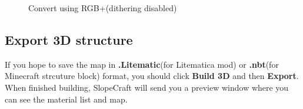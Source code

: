 \documentclass{article}
\begin{document}
    \begin{figure}[htbp]
        \centering
        \setcounter{subfigure}{0}
        \caption{Convert using RGB+(dithering disabled)}
    \end{figure}
    
    \subsection{Export 3D structure}
    If you hope to save the map in \textbf{.Litematic}(for Litematica mod) or \textbf{.nbt}(for Minecraft strcuture block) format, you should click \textbf{Build 3D} and then \textbf{Export}. When finished building, SlopeCraft will send you a preview window where you can see the material list and map.
\end{document}
